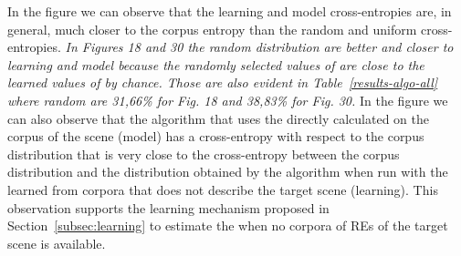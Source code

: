 In the figure we can observe that the learning and model cross-entropies are, in general, much closer to the corpus entropy than the random and uniform cross-entropies. \textit{In Figures 18 and 30 the random distribution are better and closer to learning and model because the randomly selected values of \puse are close to the learned values of \puse by chance. Those are also evident in Table~\ref{results-algo-all} where random are 31,66\% for Fig. 18 and 38,83\% for Fig. 30.}
In the figure we can also observe that the algorithm that uses the \puse directly calculated on the corpus of the scene (model) has a cross-entropy with respect to the corpus distribution that is very close to the cross-entropy between the corpus distribution and the distribution obtained by the algorithm when run with the \puse learned from corpora that does not describe the target scene (learning). This observation supports the learning mechanism proposed in Section~\ref{subsec:learning} to estimate the \puse when no corpora of REs of the target scene is available. 
